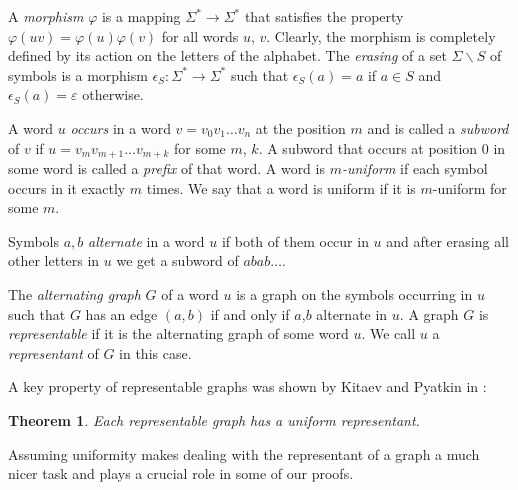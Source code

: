\documentclass[12pt]{article}
\newtheorem{theorem}{Theorem}
\begin{document}
A \emph{morphism} $\varphi$ is a mapping $\Sigma^* \rightarrow \Sigma^*$ that satisfies the property $\varphi(uv)=\varphi(u)\varphi(v)$ for all words $u$, $v$. Clearly, the morphism is completely defined by its action on the letters of the alphabet. The \emph{erasing} of a set $\Sigma \backslash S$ of symbols is a morphism $\epsilon_S : \Sigma^* \rightarrow \Sigma^*$ such that $\epsilon_S(a)=a$ if $a\in S$ and $\epsilon_S(a)=\varepsilon$ otherwise.

A word $u$ \emph{occurs} in a word $v=v_0v_1\ldots v_n$ at the position $m$ and is called a \emph{subword} of $v$ if $u=v_mv_{m+1}\ldots v_{m+k}$ for some $m$, $k$. A subword that occurs at position $0$ in some word is called a \emph{prefix} of that word. A word is \emph{$m$-uniform} if each symbol occurs in it exactly $m$ times. We say that a word is uniform if it is $m$-uniform for some $m$.

Symbols $a,b$ \emph{alternate} in a word $u$ if both of them occur in $u$ and after erasing all other letters in $u$ we get a subword of $abab\ldots$. %

The \emph{alternating graph} $G$ of a word $u$ is a graph on the symbols occurring in $u$ such that $G$ has an edge $(a,b)$ if and only if $a$,$b$ alternate in $u$. A graph $G$ is \emph{representable} if it is the alternating graph of some word $u$. We call $u$ a \emph{representant} of $G$ in this case.

A key property of representable graphs was shown by Kitaev and Pyatkin in \cite{KP}:
\begin{theorem}\label{tRepByUni} Each representable graph has a uniform representant.
\end{theorem}

Assuming uniformity makes dealing with the representant of a graph a much nicer task and plays a crucial role in some of our proofs. 
\end{document}
